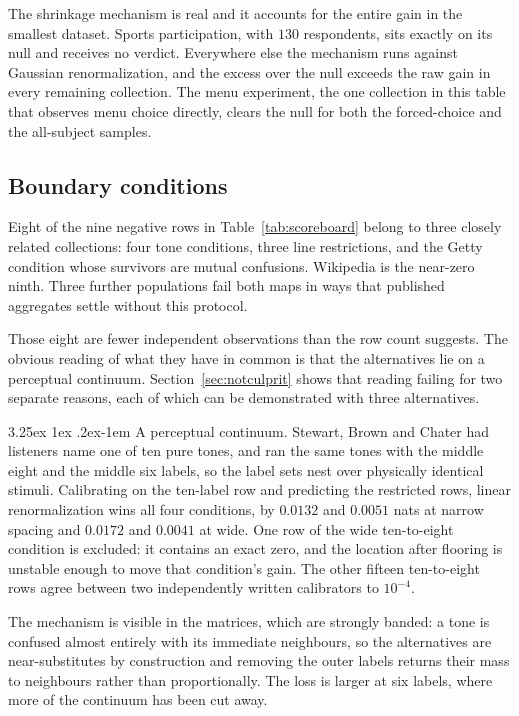 \documentclass[11pt]{article}
\makeatletter
\theoremstyle{italichead}
\renewcommand\paragraph{\@startsection{paragraph}{4}{\z@}%
  {3.25ex \@plus1ex \@minus.2ex}{-1em}%
  {\normalfont\normalsize\itshape}}
\makeatother
\begin{document}
The shrinkage mechanism is real and it accounts for the entire gain in the smallest
dataset. Sports participation, with $130$ respondents, sits exactly on its null and
receives no verdict. Everywhere else the mechanism runs against Gaussian renormalization, and
the excess over the null exceeds the raw gain in every remaining collection. The menu
experiment, the one collection in this table that observes menu choice directly, clears the null
for both the forced-choice and the all-subject samples.

\subsection{Boundary conditions}
\label{sec:boundary}

Eight of the nine negative rows in Table~\ref{tab:scoreboard} belong to three closely related
collections: four tone conditions, three line restrictions, and the Getty condition whose
survivors are mutual confusions. Wikipedia is the near-zero ninth. Three further populations fail
both maps in ways that published aggregates settle without this protocol.

Those eight are fewer independent observations than the row count suggests. The obvious reading of
what they have in common is that the alternatives lie on a perceptual continuum.
Section~\ref{sec:notculprit} shows that reading failing for two separate reasons, each of which
can be demonstrated with three alternatives.

\paragraph{A perceptual continuum.} Stewart, Brown and Chater \cite{stewart2005} had
listeners name one of ten pure tones, and ran the same tones with the middle eight and the
middle six labels, so the label sets nest over physically identical stimuli. Calibrating on
the ten-label row and predicting the restricted rows, linear renormalization wins all four
conditions, by $0.0132$ and $0.0051$ nats at narrow spacing and $0.0172$ and $0.0041$ at wide. One row of the wide
ten-to-eight condition is excluded: it contains an exact zero, and the location after flooring
is unstable enough to move that condition's gain. The other fifteen ten-to-eight rows agree
between two independently written calibrators to $10^{-4}$.

The mechanism is visible in the matrices, which are strongly banded: a tone is
confused almost entirely with its immediate neighbours, so the alternatives are
near-substitutes by construction and removing the outer labels returns their mass to
neighbours rather than proportionally. The loss is larger at six labels, where more of the
continuum has been cut away.
\end{document}
